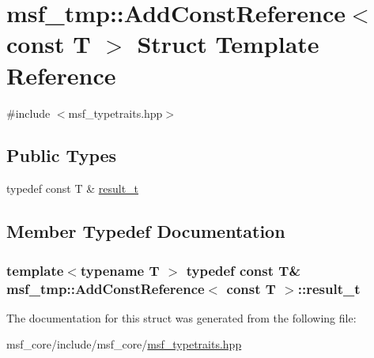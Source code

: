 \hypertarget{structmsf__tmp_1_1AddConstReference_3_01const_01T_01_4}{\section{msf\-\_\-tmp\-:\-:Add\-Const\-Reference$<$ const T $>$ Struct Template Reference}
\label{structmsf__tmp_1_1AddConstReference_3_01const_01T_01_4}
}


{\ttfamily \#include $<$msf\-\_\-typetraits.\-hpp$>$}

\subsection*{Public Types}
\begin{DoxyCompactItemize}
\item 
typedef const T \& \hyperlink{structmsf__tmp_1_1AddConstReference_3_01const_01T_01_4_adf325d18e253a3f5625ba8456ce75652}{result\-\_\-t}
\end{DoxyCompactItemize}


\subsection{Member Typedef Documentation}
\hypertarget{structmsf__tmp_1_1AddConstReference_3_01const_01T_01_4_adf325d18e253a3f5625ba8456ce75652}{
\subsubsection[{result\-\_\-t}]{\setlength{\rightskip}{0pt plus 5cm}template$<$typename T $>$ typedef const T\& {\bf msf\-\_\-tmp\-::\-Add\-Const\-Reference}$<$ const T $>$\-::{\bf result\-\_\-t}}}\label{structmsf__tmp_1_1AddConstReference_3_01const_01T_01_4_adf325d18e253a3f5625ba8456ce75652}


The documentation for this struct was generated from the following file\-:\begin{DoxyCompactItemize}
\item 
msf\-\_\-core/include/msf\-\_\-core/\hyperlink{msf__typetraits_8hpp}{msf\-\_\-typetraits.\-hpp}\end{DoxyCompactItemize}

